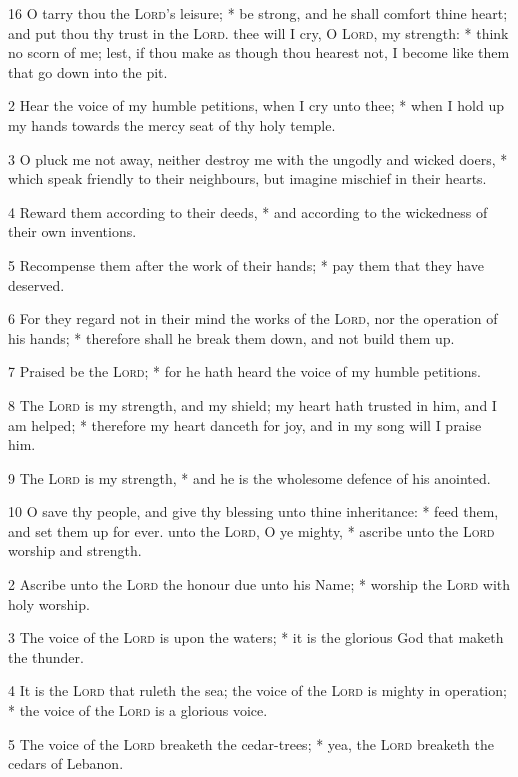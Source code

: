 16 O tarry thou the {\textsc{Lord}}'s leisure; * be strong, and he shall comfort thine heart; and put thou thy trust in the {\textsc{Lord}}.
 thee will I cry, O {\textsc{Lord}}, my strength: * think no scorn of me; lest, if thou make as though thou hearest not, I become like them that go down into the pit.\par
2 Hear the voice of my humble petitions, when I cry unto thee; * when I hold up my hands towards the mercy seat of thy holy temple.\par
3 O pluck me not away, neither destroy me with the ungodly and wicked doers, * which speak friendly to their neighbours, but imagine mischief in their hearts.\par
4 Reward them according to their deeds, * and according to the wickedness of their own inventions.\par
5 Recompense them after the work of their hands; * pay them that they have deserved.\par
6 For they regard not in their mind the works of the {\textsc{Lord}}, nor the operation of his hands; * therefore shall he break them down, and not build them up.\par
7 Praised be the {\textsc{Lord}}; * for he hath heard the voice of my humble petitions.\par
8 The {\textsc{Lord}} is my strength, and my shield; my heart hath trusted in him, and I am helped; * therefore my heart danceth for joy, and in my song will I praise him.\par
9 The {\textsc{Lord}} is my strength, * and he is the wholesome defence of his anointed.\par
10 O save thy people, and give thy blessing unto thine inheritance: * feed them, and set them up for ever.
 unto the {\textsc{Lord}}, O ye mighty, * ascribe unto the {\textsc{Lord}} worship and strength.\par
2 Ascribe unto the {\textsc{Lord}} the honour due unto his Name; * worship the {\textsc{Lord}} with holy worship.\par
3 The voice of the {\textsc{Lord}} is upon the waters; * it is the glorious God that maketh the thunder.\par
4 It is the {\textsc{Lord}} that ruleth the sea; the voice of the {\textsc{Lord}} is mighty in operation; * the voice of the {\textsc{Lord}} is a glorious voice.\par
5 The voice of the {\textsc{Lord}} breaketh the cedar-trees; * yea, the {\textsc{Lord}} breaketh the cedars of Lebanon.\par

